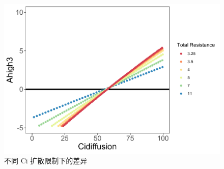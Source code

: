 \documentclass[
]{krantz}
\begin{document}
\begin{figure}
\centering
\includegraphics{bookdown_files/figure-latex/difuci-1.pdf}
\caption{\label{fig:difuci}不同 Ci 扩散限制下的差异}
\end{figure}
\end{document}
